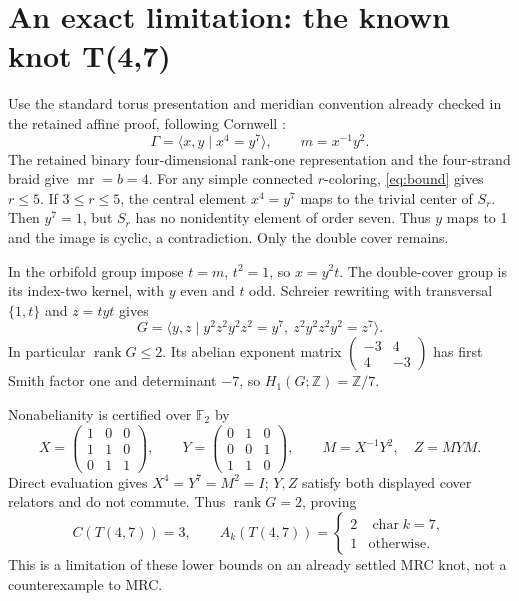 \documentclass[11pt]{article}
\newcommand{\mr}{\operatorname{mr}}
\newcommand{\rank}{\operatorname{rank}}
\newcommand{\Z}{\mathbb Z}
\newcommand{\F}{\mathbb F}
\begin{document}
\section{An exact limitation: the known knot T(4,7)}

Use the standard torus presentation and meridian convention
already checked in the retained affine proof, following
Cornwell \cite[Section 5.1]{cornwell}:
\[
 \Gamma=\langle x,y\mid x^4=y^7\rangle,\qquad m=x^{-1}y^2.
\]
The retained binary four-dimensional rank-one representation
and the four-strand braid give $\mr=b=4$.
For any simple connected $r$-coloring, \eqref{eq:bound}
gives $r\le5$. If $3\le r\le5$, the central element
$x^4=y^7$ maps to the trivial center of $S_r$.
Then $y^7=1$, but $S_r$ has no nonidentity element of
order seven. Thus $y$ maps to 1 and the image is cyclic,
a contradiction. Only the double cover remains.

In the orbifold group impose $t=m$, $t^2=1$, so $x=y^2t$.
The double-cover group is its index-two kernel, with $y$
even and $t$ odd. Schreier rewriting with transversal
$\{1,t\}$ and $z=tyt$ gives
\[
 G=\langle y,z\mid y^2z^2y^2z^2=y^7,
                         \ z^2y^2z^2y^2=z^7\rangle.
\]
In particular $\rank G\le2$. Its abelian exponent matrix
$\left(\begin{smallmatrix}-3&4\\4&-3\end{smallmatrix}\right)$
has first Smith factor one and determinant $-7$, so
$H_1(G;\Z)=\Z/7$.

Nonabelianity is certified over $\F_2$ by
\[
 X=\begin{pmatrix}1&0&0\\1&1&0\\0&1&1\end{pmatrix},\qquad
 Y=\begin{pmatrix}0&1&0\\0&0&1\\1&1&0\end{pmatrix},\qquad
 M=X^{-1}Y^2,\quad Z=MYM.
\]
Direct evaluation gives $X^4=Y^7=M^2=I$; $Y,Z$ satisfy
both displayed cover relators and do not commute.
Thus $\rank G=2$, proving
\[
 C(T(4,7))=3,\qquad
 A_k(T(4,7))=\begin{cases}2&\operatorname{char}k=7,\\
                         1&\text{otherwise}.
                  \end{cases}
\]
This is a limitation of these lower bounds on an already
settled MRC knot, not a counterexample to MRC.
\end{document}
